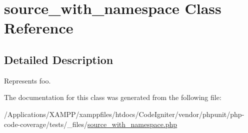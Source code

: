 \hypertarget{classbar_1_1baz_1_1source__with__namespace}{}\section{source\+\_\+with\+\_\+namespace Class Reference}
\label{classbar_1_1baz_1_1source__with__namespace}


\subsection{Detailed Description}
Represents foo. 

The documentation for this class was generated from the following file\+:\begin{DoxyCompactItemize}
\item 
/\+Applications/\+X\+A\+M\+P\+P/xamppfiles/htdocs/\+Code\+Igniter/vendor/phpunit/php-\/code-\/coverage/tests/\+\_\+files/\mbox{\hyperlink{source__with__namespace_8php}{source\+\_\+with\+\_\+namespace.\+php}}\end{DoxyCompactItemize}
